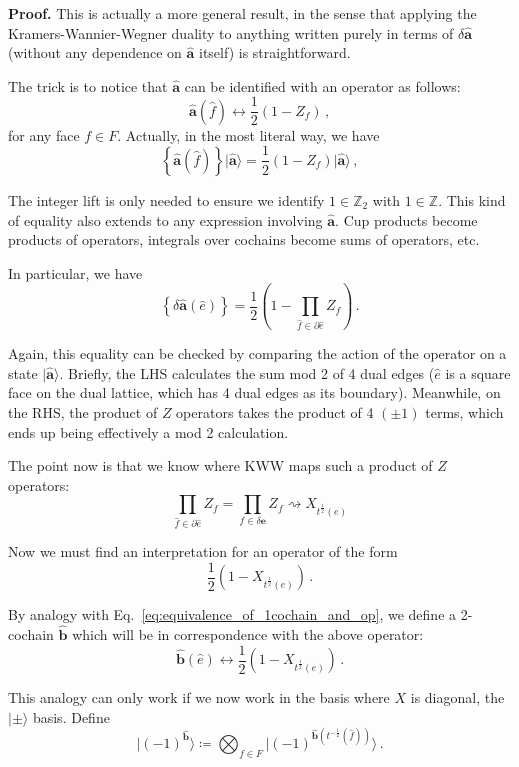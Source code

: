 \documentclass[aps,twocolumn,prx,floatfix,preprintnumbers, nofootinbib,10pt]{revtex4-2}
\numberwithin{equation}{section}
\theoremstyle{definition}
\theoremstyle{remark}
\theoremstyle{claim}
\newcommand{\be}{\begin{equation}}
\newcommand{\ee}{\end{equation}}
\newcommand{\lbbb}{\left\{}
\newcommand{\rbbb}{\right\}}
\newcommand{\Z}{{\mathbb Z}}
\newcommand{\lrb}[1]{\lbbb #1 \rbbb}
\def\ket#1{{|{#1}\rangle}}
\newcommand{\paren}[1]{\left( #1 \right)}
\begin{document}
\noindent
{\bf Proof.} This is actually a more general result, in the sense that applying the Kramers-Wannier-Wegner duality to anything written purely in terms of $\delta \bm{\hat{a}}$ (without any dependence on $\bm{\hat{a}}$ itself) is straightforward.

The trick is to notice that $\bm{\hat{a}}$ can be identified with an operator as follows:
\be
\bm{\hat{a}}(\hat{f}) \longleftrightarrow \frac{1}{2}(1 - Z_f) \,,
\ee
for any face $f \in F$. Actually, in the most literal way, we have
\be\label{eq:equivalence_of_1cochain_and_op}
\lrb{\bm{\hat{a}}(\hat{f})} \ket{\bm{\hat{a}}} = \frac{1}{2} (1 - Z_f) \ket{\bm{\hat{a}}} \,,
\ee

The integer lift is only needed to ensure we identify $1 \in \Z_2$ with $1 \in \Z$. This kind of equality also extends to any expression involving $\bm{\hat{a}}$. Cup products become products of operators, integrals over cochains become sums of operators, etc.

In particular, we have
\be
\lrb{ \delta \bm{\hat{a}} (\hat{e}) } = \frac{1}{2} \paren{1 - \prod_{\hat{f} \in \partial \hat{e}} Z_f} \,.
\ee

Again, this equality can be checked by comparing the action of the operator on a state $\ket{\bm{\hat{a}}}$. Briefly, the LHS calculates the sum mod 2 of 4 dual edges ($\hat{e}$ is a square face on the dual lattice, which has 4 dual edges as its boundary). Meanwhile, on the RHS, the product of $Z$ operators takes the product of 4 $(\pm 1)$ terms, which ends up being effectively a mod 2 calculation.

The point now is that we know where KWW maps such a product of $Z$ operators:
\be
\prod_{\hat{f} \in \partial \hat{e}} Z_f = \prod_{f \in \delta \bm{e}} Z_f \rightsquigarrow X_{t^\frac{1}{2} (e)}
\ee

Now we must find an interpretation for an operator of the form
\be
\frac{1}{2} \paren{1 - X_{t^\frac{1}{2}(e)}} \,.
\ee

By analogy with Eq.~\eqref{eq:equivalence_of_1cochain_and_op}, we define a 2-cochain $\bm{\hat{b}}$ which will be in correspondence with the above operator:
\be
\bm{\hat{b}}(\hat{e}) \longleftrightarrow \frac{1}{2} \paren{1 - X_{t^\frac{1}{2}(e)}} \,.
\ee

This analogy can only work if we now work in the basis where $X$ is diagonal, the $\ket{\pm}$ basis. Define
\be
\ket{(-1)^{\bm{\hat{b}}}} \coloneqq \bigotimes_{f \in F} \ket{(-1)^{\bm{\hat{b}}(t^{-\frac{1}{2}}(\hat{f}))}} \,.
\ee
\end{document}
